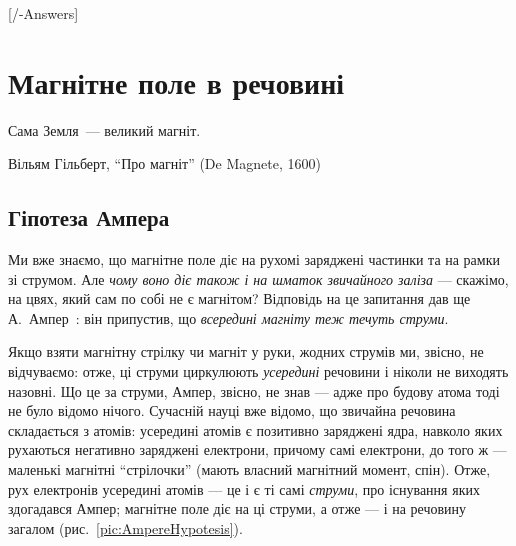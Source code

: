 
[\currfilebase/\currfilebase-Answers]
\chapter{Магнітне поле в речовині}\label{\currfilebase}\hypertarget{MagFieldMedia}{}
\graphicspath{{\currfilebase/Pictures/}}
\epigraph{\Alexander Сама Земля~--- великий магніт.}{Вільям Гільберт, \enquote{Про магніт}
	(De Magnete, 1600)}


\section*{Гіпотеза Ампера}


Ми вже знаємо, що магнітне поле діє на рухомі заряджені частинки та на рамки зі струмом.
Але \emph{чому воно діє також і на шматок звичайного заліза} --- скажімо, на цвях, який
сам по собі не є магнітом? Відповідь на це запитання дав ще А.~Ампер~\cite{Ampere1820}: він припустив, що
\emph{всередині магніту теж течуть струми}.

Якщо взяти магнітну стрілку чи магніт у руки, жодних струмів ми, звісно, не відчуваємо:
отже, ці струми циркулюють \emph{усередині} речовини і ніколи не виходять назовні. Що це
за струми, Ампер, звісно, не знав --- адже про будову атома тоді не було відомо нічого.
Сучасній науці вже відомо, що звичайна речовина складається з атомів: усередині атомів є
позитивно заряджені ядра, навколо яких рухаються негативно заряджені електрони, причому
самі електрони, до того ж --- маленькі магнітні \enquote{стрілочки} (мають власний
магнітний момент, спін). Отже, рух електронів усередині атомів --- це і є ті самі
\emph{струми}, про існування яких здогадався Ампер; магнітне поле діє на ці струми, а
отже --- і на речовину загалом (рис.~\ref{pic:AmpereHypotesis}).

